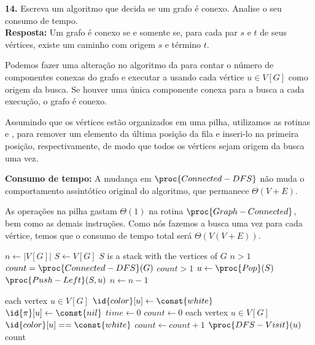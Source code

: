 
\noindent\textbf{14.} Escreva um algoritmo que decida se um grafo é conexo. Analise o seu consumo de tempo.\\[6pt]
\textbf{Resposta:} Um grafo é conexo se e somente se, para cada par $s$ e $t$ de seus vértices, existe um caminho com origem $s$ e término $t$.

Podemos fazer uma alteração no algoritmo da  para contar o número de componentes conexas do grafo e executar a  usando cada vértice $u \in V[G]$ como origem da busca. Se houver uma única componente conexa para a busca a cada execução, o grafo é conexo.

Assumindo que os vértices estão organizados em uma pilha, utilizamos as rotinas  e , para remover um elemento da última posição da fila e inseri-lo na primeira posição, respectivamente, de modo que todos os vértices sejam origem da busca uma vez.

\textbf{Consumo de tempo:} A mudança em $\proc{Connected-DFS}$ não muda o comportamento assintótico original do algoritmo, que permanece $\Theta(V + E)$.

As operações na pilha gastam $\Theta(1)$ na rotina $\proc{Graph-Connected}$, bem como as demais instruções. Como nós fazemos a busca uma vez para cada vértice, temos que o consumo de tempo total será $\Theta(V(V + E))$.

\begin{codebox}
\li	$n \gets |V[G]|$
\li	$S \gets V[G]$ \Comment $S$ is a stack with the vertices of $G$
\li \While $n > 1$
\li \Do
        $count = \proc{Connected-DFS}(G)$
\li     \If $count > 1$
\li     \Then 
            \Return {}
        \End
\li     $u \gets \proc{Pop}(S)$
\li     $\proc{Push-Left}(S, u)$
\li     $n \gets n - 1$
    \End
\li \Return {}
\end{codebox}

\begin{codebox}
\li \For each vertex $u \in V[G]$
\li \Do
        $\id{color}[u] \gets \const{white}$
\li     $\id{\pi}[u] \gets \const{nil}$
    \End
\li $time \gets 0$
\li $count \gets 0$
\li \For each vertex $u \in V[G]$
\li \Do
        \If $\id{color}[u] == \const{white}$
\li     \Then 
            $count \gets count + 1$
\li         $\proc{DFS-Visit}(u)$
        \End
    \End
\li \Return count
\end{codebox}